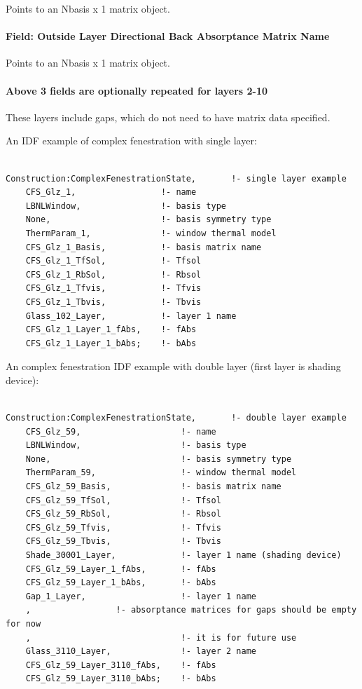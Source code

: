 Points to an Nbasis x 1 matrix object.

\paragraph{Field: Outside Layer Directional Back Absorptance Matrix Name}\label{field-outside-layer-directional-back-absorptance-matrix-name}

Points to an Nbasis x 1 matrix object.

\paragraph{Above 3 fields are optionally repeated for layers 2-10}\label{above-3-fields-are-optionally-repeated-for-layers-2-10}

These layers include gaps, which do not need to have matrix data specified.

An IDF example of complex fenestration with single layer:

\begin{lstlisting}

Construction:ComplexFenestrationState,       !- single layer example
    CFS_Glz_1,                 !- name
    LBNLWindow,                !- basis type
    None,                      !- basis symmetry type
    ThermParam_1,              !- window thermal model
    CFS_Glz_1_Basis,           !- basis matrix name
    CFS_Glz_1_TfSol,           !- Tfsol
    CFS_Glz_1_RbSol,           !- Rbsol
    CFS_Glz_1_Tfvis,           !- Tfvis
    CFS_Glz_1_Tbvis,           !- Tbvis
    Glass_102_Layer,           !- layer 1 name
    CFS_Glz_1_Layer_1_fAbs,    !- fAbs
    CFS_Glz_1_Layer_1_bAbs;    !- bAbs
\end{lstlisting}

An complex fenestration IDF example with double layer (first layer is shading device):

\begin{lstlisting}

Construction:ComplexFenestrationState,       !- double layer example
    CFS_Glz_59,                    !- name
    LBNLWindow,                    !- basis type
    None,                          !- basis symmetry type
    ThermParam_59,                 !- window thermal model
    CFS_Glz_59_Basis,              !- basis matrix name
    CFS_Glz_59_TfSol,              !- Tfsol
    CFS_Glz_59_RbSol,              !- Rbsol
    CFS_Glz_59_Tfvis,              !- Tfvis
    CFS_Glz_59_Tbvis,              !- Tbvis
    Shade_30001_Layer,             !- layer 1 name (shading device)
    CFS_Glz_59_Layer_1_fAbs,       !- fAbs
    CFS_Glz_59_Layer_1_bAbs,       !- bAbs
    Gap_1_Layer,                   !- layer 1 name
    ,                 !- absorptance matrices for gaps should be empty for now
    ,                              !- it is for future use
    Glass_3110_Layer,              !- layer 2 name
    CFS_Glz_59_Layer_3110_fAbs,    !- fAbs
    CFS_Glz_59_Layer_3110_bAbs;    !- bAbs
\end{lstlisting}

